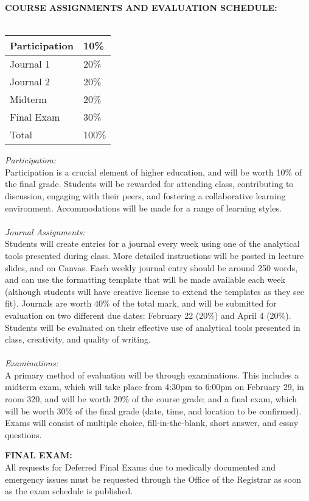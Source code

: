 \documentclass[10pt]{article}
\begin{document}
\textbf{COURSE ASSIGNMENTS AND EVALUATION SCHEDULE:}\\\\
{\renewcommand{\arraystretch}{1.2}
\begin{tabular}{|l|l|}\hline
	Participation & 10\% \\\hline
	Journal 1 & 20\% \\\hline
	Journal 2 & 20\% \\\hline
	Midterm & 20\% \\\hline
	Final Exam & 30\% \\\hline\hline
	Total & 100\% \\\hline
\end{tabular}
}

\textit{Participation:}\\ 
Participation is a crucial element of higher education, and will be worth 10\% of the final grade. Students will be rewarded for attending class, contributing to discussion, engaging with their peers, and fostering a collaborative learning environment. Accommodations will be made for a range of learning styles.\\\\
\textit{Journal Assignments:}\\
Students will create entries for a journal every week using one of the analytical tools presented during class. More detailed instructions will be posted in lecture slides, and on Canvas. Each weekly journal entry should be around 250 words, and can use the formatting template that will be made available each week (although students will have creative license to extend the templates as they see fit). Journals are worth 40\% of the total mark, and will be submitted for evaluation on two different due dates: February 22 (20\%) and April 4 (20\%). Students will be evaluated on their effective use of analytical tools presented in class, creativity, and quality of writing.\\\\
\textit{Examinations:}\\ 
A primary method of evaluation will be through examinations. This includes a midterm exam, which will take place from 4:30pm to 6:00pm on February 29, in room 320, and will be worth 20\% of the course grade; and a final exam, which will be worth 30\% of the final grade (date, time, and location to be confirmed). Exams will consist of multiple choice, fill-in-the-blank, short answer, and essay questions. 

\textbf{FINAL EXAM:}\\
All requests for Deferred Final Exams due to medically documented and emergency issues must be requested through the Office of the Registrar as soon as the exam schedule is published.
\end{document}
